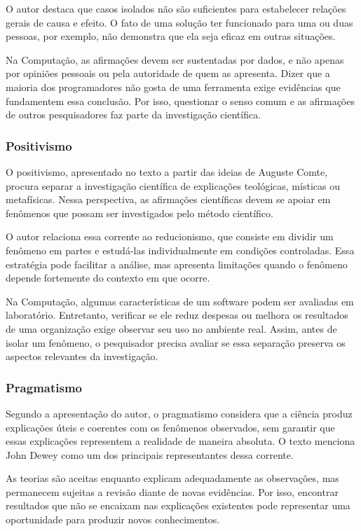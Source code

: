\documentclass[12pt,a4paper]{article}
\begin{document}
O autor destaca que casos isolados não são suficientes para estabelecer relações gerais de causa e efeito. O fato de uma solução ter funcionado para uma ou duas pessoas, por exemplo, não demonstra que ela seja eficaz em outras situações.

Na Computação, as afirmações devem ser sustentadas por dados, e não apenas por opiniões pessoais ou pela autoridade de quem as apresenta. Dizer que a maioria dos programadores não gosta de uma ferramenta exige evidências que fundamentem essa conclusão. Por isso, questionar o senso comum e as afirmações de outros pesquisadores faz parte da investigação científica.

\subsubsection{Positivismo}

O positivismo, apresentado no texto a partir das ideias de Auguste Comte, procura separar a investigação científica de explicações teológicas, místicas ou metafísicas. Nessa perspectiva, as afirmações científicas devem se apoiar em fenômenos que possam ser investigados pelo método científico.

O autor relaciona essa corrente ao reducionismo, que consiste em dividir um fenômeno em partes e estudá-las individualmente em condições controladas. Essa estratégia pode facilitar a análise, mas apresenta limitações quando o fenômeno depende fortemente do contexto em que ocorre.

Na Computação, algumas características de um software podem ser avaliadas em laboratório. Entretanto, verificar se ele reduz despesas ou melhora os resultados de uma organização exige observar seu uso no ambiente real. Assim, antes de isolar um fenômeno, o pesquisador precisa avaliar se essa separação preserva os aspectos relevantes da investigação.

\subsubsection{Pragmatismo}

Segundo a apresentação do autor, o pragmatismo considera que a ciência produz explicações úteis e coerentes com os fenômenos observados, sem garantir que essas explicações representem a realidade de maneira absoluta. O texto menciona John Dewey como um dos principais representantes dessa corrente.

As teorias são aceitas enquanto explicam adequadamente as observações, mas permanecem sujeitas a revisão diante de novas evidências. Por isso, encontrar resultados que não se encaixam nas explicações existentes pode representar uma oportunidade para produzir novos conhecimentos.
\end{document}
